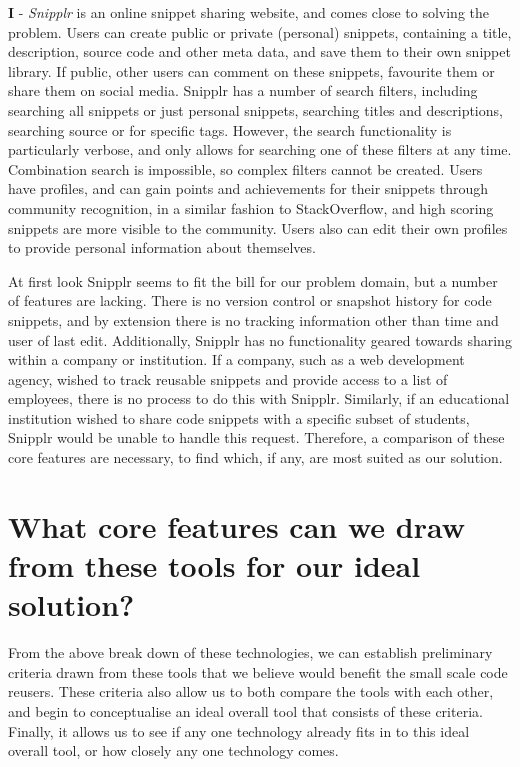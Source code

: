 \textbf{I} - \textit{Snipplr} is an online snippet sharing website, and comes close to solving the problem.
Users can create public or private (personal) snippets, containing a title, description, source code and other meta data, and save them to their own snippet library.
If public, other users can comment on these snippets, favourite them or share them on social media.
Snipplr has a number of search filters, including searching all snippets or just personal snippets, searching titles and descriptions, searching source or for specific tags.
However, the search functionality is particularly verbose, and only allows for searching one of these filters at any time.
Combination search is impossible, so complex filters cannot be created.
Users have profiles, and can gain points and achievements for their snippets through community recognition, in a similar fashion to StackOverflow, and high scoring snippets are more visible to the community.
Users also can edit their own profiles to provide personal information about themselves.

At first look Snipplr seems to fit the bill for our problem domain, but a number of features are lacking.
There is no version control or snapshot history for code snippets, and by extension there is no tracking information other than time and user of last edit.
Additionally, Snipplr has no functionality geared towards sharing within a company or institution.
If a company, such as a web development agency, wished to track reusable snippets and provide access to a list of employees, there is no process to do this with Snipplr.
Similarly, if an educational institution wished to share code snippets with a specific subset of students, Snipplr would be unable to handle this request.
Therefore, a comparison of these core features are necessary, to find which, if any, are most suited as our solution.

\section{What core features can we draw from these tools for our ideal solution?}
From the above break down of these technologies, we can establish preliminary criteria drawn from these tools that we believe would benefit the small scale code reusers.
These criteria also allow us to both compare the tools with each other, and begin to conceptualise an ideal overall tool that consists of these criteria.
Finally, it allows us to see if any one technology already fits in to this ideal overall tool, or how closely any one technology comes.

